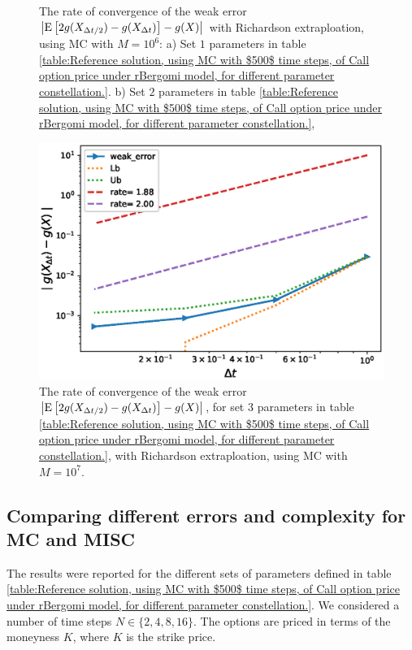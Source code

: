 \begin{figure}[h!]
	\caption{The rate of convergence of the weak error  $\left\lvert\mathrm{E}\left[2 g(X_{\Delta t/2}) -g(X_{\Delta t})\right]-g(X)\right\rvert$   with Richardson extraploation, using MC with $M=10^6$: a) Set $1$ parameters in table \ref{table:Reference solution, using MC with $500$ time steps, of Call option price under rBergomi model, for different parameter constellation.}.  b) Set $2$ parameters in table \ref{table:Reference solution, using MC with $500$ time steps, of Call option price under rBergomi model, for different parameter constellation.}, }
	\label{fig:Weak_rate_H_043_007_with_rich}
\end{figure}




\begin{figure}[!htbp]
	\centering
		\includegraphics[width=0.4\linewidth]{./figures/rBergomi_weak_error_rates/with_richardson/H_002/weak_convergence_order_Bergomi_H_002_K_1_M_1_10_7_richardson_relative}
	\caption{The rate of convergence of the weak error $\left\lvert\mathrm{E}\left[2 g(X_{\Delta t/2}) -g(X_{\Delta t})\right]-g(X)\right\rvert$,  for set $3$ parameters in table \ref{table:Reference solution, using MC with $500$ time steps, of Call option price under rBergomi model, for different parameter constellation.}, with Richardson extraploation, using MC with $M=10^7$. }
	\label{fig:Weak_rate_H_002_with_rich_K1}
\end{figure}
\FloatBarrier




\subsection{Comparing different  errors and complexity for MC and MISC}\label{sec:Comparing different  errors and complexity for MC and MISC}


The results were reported for the different sets of parameters defined in table \ref{table:Reference solution, using MC with $500$ time steps, of Call option price under rBergomi model, for different parameter constellation.}. We considered   a number of time steps $N \in \{2,4,8,16\}$.  The options are priced in terms of the moneyness $K$, where $K$ is the strike price.   

